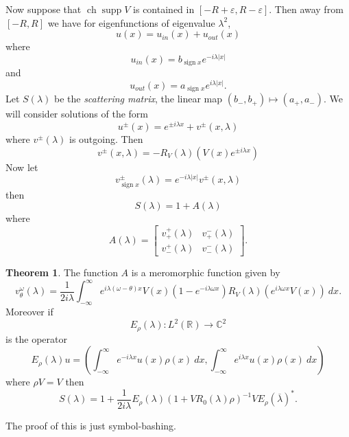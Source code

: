 \documentclass[12pt]{report}
\newcommand{\RR}{\mathbb{R}}
\newcommand{\CC}{\mathbb{C}}
\newcommand{\ch}{\operatorname{ch}}
\DeclareMathOperator*{\sgn}{sign}
\newcommand{\supp}{\operatorname{supp}}
\newcommand{\dfn}[1]{\emph{#1}\index{#1}}
\theoremstyle{definition}
\newtheorem{theorem}{Theorem}[chapter]
\begin{document}
Now suppose that $\ch \supp V$ is contained in $[-R + \varepsilon, R - \varepsilon]$.
Then away from $[-R, R]$ we have for eigenfunctions of eigenvalue $\lambda^2$,
$$u(x) = u_{in}(x) + u_{out}(x)$$
where
$$u_{in}(x) = b_{\sgn x} e^{-i\lambda|x|}$$
and
$$u_{out}(x) = a_{\sgn x} e^{i\lambda|x|}.$$
Let $S(\lambda)$ be the \dfn{scattering matrix}, the linear map $(b_-, b_+) \mapsto (a_+, a_-)$.
We will consider solutions of the form
$$u^\pm(x) = e^{\pm i\lambda x} + v^\pm(x, \lambda)$$
where $v^\pm(\lambda)$ is outgoing. Then
$$v^\pm(x, \lambda) = -R_V(\lambda)(V(x)e^{\pm i\lambda x})$$
Now let
$$v^\pm_{\sgn x}(\lambda) = e^{-i\lambda|x|}v^\pm(x, \lambda)$$
then
$$S(\lambda) = 1 + A(\lambda)$$
where
$$A(\lambda) = \begin{bmatrix}v^+_+(\lambda) & v_+^-(\lambda)\\ v_-^+(\lambda) & v_-^-(\lambda)\end{bmatrix}.$$

\begin{theorem}
The function $A$ is a meromorphic function given by
$$v^\omega_\theta(\lambda) = \frac{1}{2i\lambda} \int_{-\infty}^\infty e^{i\lambda(\omega - \theta)x}V(x)(1-e^{-i\lambda\omega x})R_V(\lambda)(e^{i\lambda\omega x}V(x))~dx.$$
Moreover if
$$E_\rho(\lambda): L^2(\RR) \to \CC^2$$
is the operator
$$E_\rho(\lambda)u = \left(\int_{-\infty}^\infty e^{-i\lambda x}u(x)\rho(x)~dx , \int_{-\infty}^\infty e^{i\lambda x}u(x)\rho(x) ~dx \right)$$
where $\rho V = V$ then
$$S(\lambda) = 1 + \frac{1}{2i\lambda}E_\rho(\lambda)(1 + VR_0(\lambda)\rho)^{-1} V E_\rho(\overline \lambda)^*.$$
\end{theorem}
The proof of this is just symbol-bashing.
\end{document}
